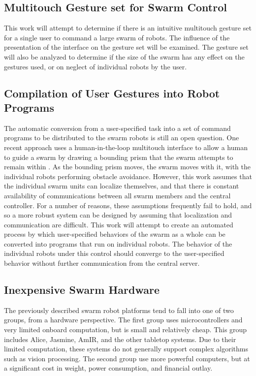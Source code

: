 \documentclass[]{article}
\begin{document}
\subsection{Multitouch Gesture set for Swarm Control}
This work will attempt to determine if there is an intuitive multitouch gesture set for a single user to command a large swarm of robots.
The influence of the presentation of the interface on the gesture set will be examined. 
The gesture set will also be analyzed to determine if the size of the swarm has any effect on the gestures used, or on neglect of individual robots by the user. 

\subsection{Compilation of User Gestures into Robot Programs}
The automatic conversion from a user-specified task into a set of command programs to be distributed to the swarm robots is still an open question.
One recent approach uses a human-in-the-loop multitouch interface to allow a human to guide a swarm by drawing a bounding prism that the swarm attempts to remain within \cite{ayanian2014controlling}. 
As the bounding prism moves, the swarm moves with it, with the individual robots performing obstacle avoidance. 
However, this work assumes that the individual swarm units can localize themselves, and that there is constant availability of communications between all swarm members and the central controller. 
For a number of reasons, these assumptions frequently fail to hold, and so a more robust system can be designed by assuming that localization and communication are difficult. 
This work will attempt to create an automated process by which user-specified behaviors of the swarm as a whole can be converted into programs that run on individual robots. 
The behavior of the individual robots under this control should converge to the user-specified behavior without further communication from the central server.

\subsection{Inexpensive Swarm Hardware}

The previously described swarm robot platforms tend to fall into one of two groups, from a hardware perspective. 
The first group uses microcontrollers and very limited onboard computation, but is small and relatively cheap.
This group includes Alice, Jasmine, AmIR, and the other tabletop systems. 
Due to their limited computation, these systems do not generally support complex algorithms such as vision processing. 
The second group use more powerful computers, but at a significant cost in weight, power consumption, and financial outlay.
\end{document}
